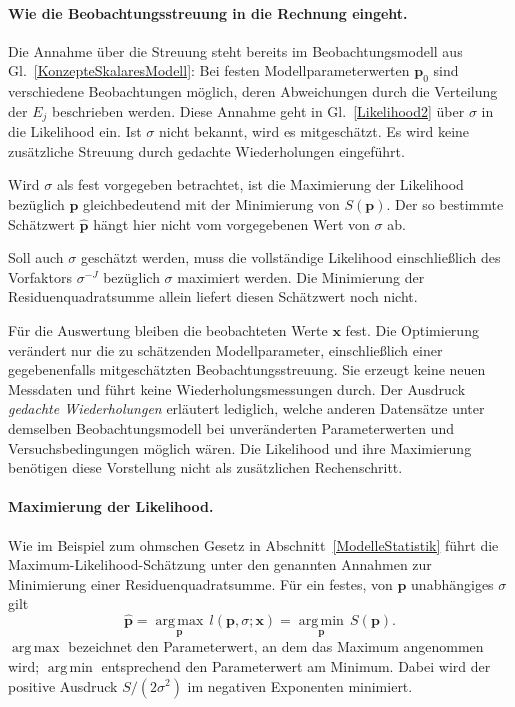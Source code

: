 \paragraph{Wie die Beobachtungsstreuung in die Rechnung eingeht.}
Die Annahme über die Streuung steht bereits im Beobachtungsmodell
aus Gl.~\eqref{KonzepteSkalaresModell}: Bei festen Modellparameterwerten
$\mathbf p_0$ sind verschiedene Beobachtungen möglich, deren
Abweichungen durch die Verteilung der $E_j$ beschrieben werden.
Diese Annahme geht in Gl.~\eqref{Likelihood2} über $\sigma$ in die
Likelihood ein. Ist $\sigma$ nicht bekannt, wird es mitgeschätzt.
Es wird keine zusätzliche Streuung durch gedachte Wiederholungen
eingeführt.

Wird $\sigma$ als fest vorgegeben betrachtet, ist die Maximierung
der Likelihood bezüglich $\mathbf p$ gleichbedeutend mit der
Minimierung von $S(\mathbf p)$. Der so bestimmte Schätzwert
$\widehat{\mathbf p}$ hängt hier nicht vom vorgegebenen Wert
von $\sigma$ ab.

Soll auch $\sigma$ geschätzt werden, muss die vollständige
Likelihood einschließlich des Vorfaktors $\sigma^{-J}$ bezüglich
$\sigma$ maximiert werden. Die Minimierung der Residuenquadratsumme
allein liefert diesen Schätzwert noch nicht.

Für die Auswertung bleiben die beobachteten Werte $\mathbf x$ fest.
Die Optimierung verändert nur die zu schätzenden Modellparameter,
einschließlich einer gegebenenfalls mitgeschätzten Beobachtungsstreuung.
Sie erzeugt keine neuen Messdaten und führt keine Wiederholungs\-messungen
durch. Der Ausdruck \textsl{gedachte Wiederholungen} erläutert lediglich,
welche anderen Datensätze unter demselben Beobachtungsmodell bei
unveränderten Parameterwerten und Versuchs\-bedingungen möglich wären.
Die Likelihood und ihre Maximierung benötigen diese Vorstellung
nicht als zusätzlichen Rechenschritt.

\paragraph{Maximierung der Likelihood.}

Wie im Beispiel zum ohmschen Gesetz in Abschnitt~\ref{ModelleStatistik}
führt die Maximum-Likelihood-Schätzung unter den genannten Annahmen zur
Minimierung einer Residuenquadratsumme. Für ein festes, von
$\mathbf{p}$ unabhängiges $\sigma$ gilt
\begin{equation}
\widehat{\mathbf{p}}
=\underset{\mathbf{p}}{\operatorname{arg\,max}}\,
l(\mathbf{p},\sigma;\mathbf{x})
=\underset{\mathbf{p}}{\operatorname{arg\,min}}\,S(\mathbf{p}).
\end{equation}
$\operatorname{arg\,max}$ bezeichnet den Parameterwert, an dem das
Maximum angenommen wird; $\operatorname{arg\,min}$ entsprechend den
Parameterwert am Minimum. Dabei wird der positive Ausdruck $S/(2\sigma^2)$ im negativen
Exponenten minimiert.

